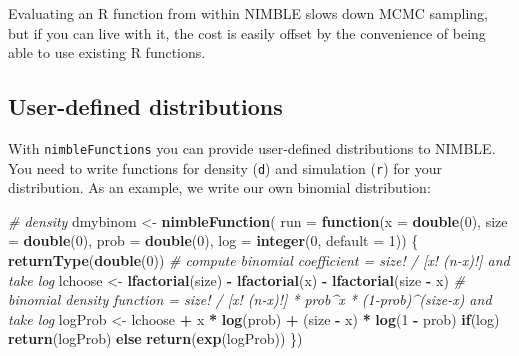 \documentclass[
  12pt,
]{krantz}
\newenvironment{Shaded}{\begin{snugshade}}{\end{snugshade}}
\newcommand{\AttributeTok}[1]{\textcolor[rgb]{0.13,0.29,0.53}{#1}}
\newcommand{\CommentTok}[1]{\textcolor[rgb]{0.56,0.35,0.01}{\textit{#1}}}
\newcommand{\ControlFlowTok}[1]{\textcolor[rgb]{0.13,0.29,0.53}{\textbf{#1}}}
\newcommand{\DecValTok}[1]{\textcolor[rgb]{0.00,0.00,0.81}{#1}}
\newcommand{\FunctionTok}[1]{\textcolor[rgb]{0.13,0.29,0.53}{\textbf{#1}}}
\newcommand{\NormalTok}[1]{#1}
\newcommand{\OtherTok}[1]{\textcolor[rgb]{0.56,0.35,0.01}{#1}}
\newcommand{\SpecialCharTok}[1]{\textcolor[rgb]{0.81,0.36,0.00}{\textbf{#1}}}
\begin{document}
Evaluating an R function from within NIMBLE slows down MCMC sampling, but if you can live with it, the cost is easily offset by the convenience of being able to use existing R functions.

\subsection{User-defined distributions}\label{user-defined-distributions}

With \texttt{nimbleFunctions} you can provide user-defined distributions to NIMBLE. You need to write functions for density (\texttt{d}) and simulation (\texttt{r}) for your distribution. As an example, we write our own binomial distribution:

\begin{Shaded}
\begin{Highlighting}[]
\CommentTok{\# density}
\NormalTok{dmybinom }\OtherTok{\textless{}{-}} \FunctionTok{nimbleFunction}\NormalTok{(}
  \AttributeTok{run =} \ControlFlowTok{function}\NormalTok{(}\AttributeTok{x =} \FunctionTok{double}\NormalTok{(}\DecValTok{0}\NormalTok{), }
                 \AttributeTok{size =} \FunctionTok{double}\NormalTok{(}\DecValTok{0}\NormalTok{), }
                 \AttributeTok{prob =} \FunctionTok{double}\NormalTok{(}\DecValTok{0}\NormalTok{), }
                 \AttributeTok{log =} \FunctionTok{integer}\NormalTok{(}\DecValTok{0}\NormalTok{, }\AttributeTok{default =} \DecValTok{1}\NormalTok{)) \{}
    \FunctionTok{returnType}\NormalTok{(}\FunctionTok{double}\NormalTok{(}\DecValTok{0}\NormalTok{))}
    \CommentTok{\# compute binomial coefficient = size! / [x! (n{-}x)!] and take log}
\NormalTok{    lchoose }\OtherTok{\textless{}{-}} \FunctionTok{lfactorial}\NormalTok{(size) }\SpecialCharTok{{-}} \FunctionTok{lfactorial}\NormalTok{(x) }\SpecialCharTok{{-}} \FunctionTok{lfactorial}\NormalTok{(size }\SpecialCharTok{{-}}\NormalTok{ x)}
    \CommentTok{\# binomial density function = size! / [x! (n{-}x)!] * prob\^{}x * (1{-}prob)\^{}(size{-}x) and take log}
\NormalTok{    logProb }\OtherTok{\textless{}{-}}\NormalTok{ lchoose }\SpecialCharTok{+}\NormalTok{ x }\SpecialCharTok{*} \FunctionTok{log}\NormalTok{(prob) }\SpecialCharTok{+}\NormalTok{ (size }\SpecialCharTok{{-}}\NormalTok{ x) }\SpecialCharTok{*} \FunctionTok{log}\NormalTok{(}\DecValTok{1} \SpecialCharTok{{-}}\NormalTok{ prob)}
    \ControlFlowTok{if}\NormalTok{(log) }\FunctionTok{return}\NormalTok{(logProb)}
    \ControlFlowTok{else} \FunctionTok{return}\NormalTok{(}\FunctionTok{exp}\NormalTok{(logProb)) }
\NormalTok{  \})}

\end{Highlighting}
\end{Shaded}
\end{document}
